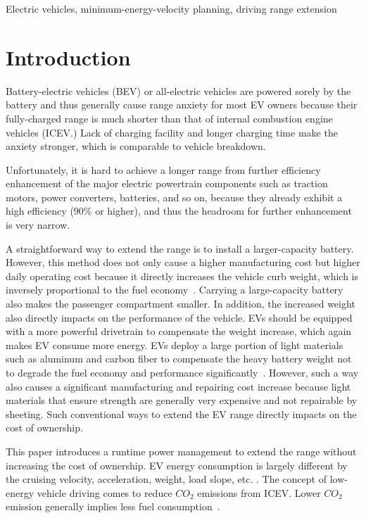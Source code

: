 \documentclass{IEEEtran}
\begin{document}
\begin{IEEEkeywords}
Electric vehicles, minimum-energy-velocity planning, driving range extension
\end{IEEEkeywords}
\section{Introduction}

Battery-electric vehicles (BEV) or all-electric vehicles are powered sorely by the battery and thus generally cause range anxiety for most EV owners because their fully-charged range is much shorter than that of internal combustion engine vehicles (ICEV.) Lack of charging facility and longer charging time make the anxiety stronger, which is comparable to vehicle breakdown.

Unfortunately, it is hard to achieve a longer range from further efficiency enhancement of the major electric powertrain components such as traction motors, power converters, batteries, and so on, because they already exhibit a high efficiency (90\% or higher), and thus the headroom for further enhancement is very narrow.

A straightforward way to extend the range is to install a larger-capacity battery. However, this method does not only cause a higher manufacturing cost but higher daily operating cost because it  directly increases the vehicle curb weight, which is inversely proportional to the fuel economy~\cite{Hong:ASPDAC16}. Carrying a large-capacity battery also makes the passenger compartment smaller. In addition, the increased weight also directly impacts on the performance of the vehicle. 
EVs should be equipped with a more powerful drivetrain to compensate the weight increase, which again makes EV consume more energy. 
EVs deploy a large portion of light materials such as aluminum and carbon fiber to compensate the heavy battery weight not to degrade the fuel economy and performance significantly~\cite{Chang:ICCAD14}. However, such a way also causes a significant manufacturing and repairing cost increase because light materials that ensure strength are generally very expensive and not repairable by sheeting. Such conventional ways to extend the EV range directly impacts on the cost of ownership.

This paper introduces a runtime power management to extend the range without increasing the cost of ownership. EV energy consumption is largely different by the cruising velocity, acceleration, weight, load slope, etc. \cite{Chang:ICCAD14}. The concept of low-energy vehicle driving comes to reduce $CO_2$ emissions from ICEV. Lower  $CO_2$ emission generally implies less fuel consumption~\cite{Seraens:thesis12}. 
\end{document}
